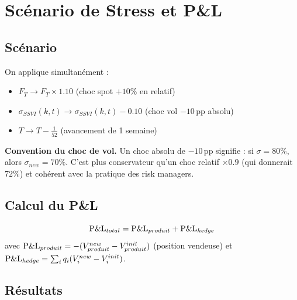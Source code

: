 \section{Scénario de Stress et P\&L}
\label{sec:stress}

\subsection{Scénario}

On applique simultanément :
\begin{itemize}
  \item $F_T \to F_T \times 1.10$ (choc spot $+10\%$ en relatif)
  \item $\sigma_{SSVI}(k,t) \to \sigma_{SSVI}(k,t) - 0.10$ (choc vol $-10\,\text{pp}$ absolu)
  \item $T \to T - \tfrac{1}{52}$ (avancement de 1 semaine)
\end{itemize}

\textbf{Convention du choc de vol.}
Un choc absolu de $-10\,\text{pp}$ signifie : si $\sigma = 80\%$, alors
$\sigma_{new} = 70\%$. C'est plus conservateur qu'un choc relatif $\times 0.9$
(qui donnerait $72\%$) et cohérent avec la pratique des risk managers.

\subsection{Calcul du P\&L}

\begin{equation}
  \text{P\&L}_{total} = \text{P\&L}_{produit} + \text{P\&L}_{hedge}
\end{equation}
avec $\text{P\&L}_{produit} = -(V_{produit}^{new} - V_{produit}^{init})$
(position vendeuse) et $\text{P\&L}_{hedge} = \sum_i q_i (V_i^{new} - V_i^{init})$.

\subsection{Résultats}

